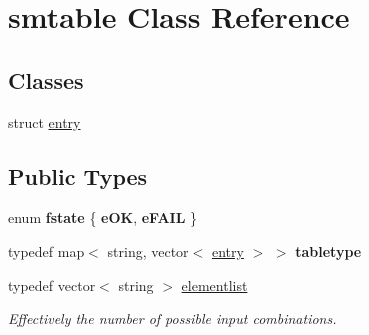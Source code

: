\hypertarget{classsmtable}{}\section{smtable Class Reference}
\label{classsmtable}
\subsection*{Classes}
\begin{DoxyCompactItemize}
\item 
struct \mbox{\hyperlink{structsmtable_1_1entry}{entry}}
\end{DoxyCompactItemize}
\subsection*{Public Types}
\begin{DoxyCompactItemize}
\item 
\mbox{\label{classsmtable_a56fdf016cc59eb93dfa17f53bd9db19a}} 
enum {\bfseries fstate} \{ {\bfseries e\+OK}, 
{\bfseries e\+F\+A\+IL}
 \}
\item 
\mbox{\label{classsmtable_a1e18f61b7a4bb0e643d83df3da0ae22c}} 
typedef map$<$ string, vector$<$ \mbox{\hyperlink{structsmtable_1_1entry}{entry}} $>$ $>$ {\bfseries tabletype}
\item 
\mbox{\label{classsmtable_a5eb5f5f14b1e52a2bde73255ea71927f}} 
typedef vector$<$ string $>$ \mbox{\hyperlink{classsmtable_a5eb5f5f14b1e52a2bde73255ea71927f}{elementlist}}
\begin{DoxyCompactList}\small\item\em Effectively the number of possible input combinations. \end{DoxyCompactList}\end{DoxyCompactItemize}
